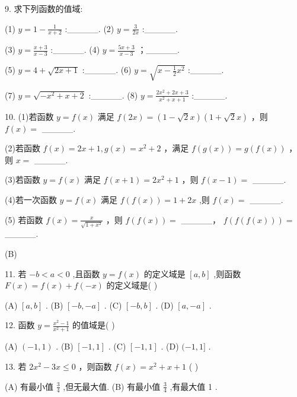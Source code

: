 \documentclass[10pt]{article}
\begin{document}
9. 求下列函数的值域:

(1) \(y = 1 - \frac{1}{x + 2}\) :\_\_\_\_\_. (2) \(y = \frac{3}{2x}\) :\_\_\_\_\_.

(3) \(y = \frac{x + 3}{x - 3}\) :\_\_\_\_\_. (4) \(y = \frac{{5x} + 3}{x - 3}\) ；\_\_\_\_\_.

(5) \(y = 4 + \sqrt{{2x} + 1}\) :\_\_\_\_\_. (6) \(y = \sqrt{x - \frac{1}{2}{x}^{2}}\) :\_\_\_\_\_.

(7) \(y = \sqrt{-{x}^{2} + x + 2}\) :\_\_\_\_\_. (8) \(y = \frac{2{x}^{2} + {2x} + 3}{{x}^{2} + x + 1}\) :\_\_\_\_\_.

10. (1)若函数 \(y = f\left( x\right)\) 满足 \(f\left( {2x}\right)  = \left( {1 - \sqrt{2}x}\right) \left( {1 + \sqrt{2}x}\right)\) ，则 \(f\left( x\right)  =\) \_\_\_\_\_.

(2)若函数 \(f\left( x\right)  = {2x} + 1,g\left( x\right)  = {x}^{2} + 2\) ，满足 \(f\left( {g\left( x\right) }\right)  = g\left( {f\left( x\right) }\right)\) ，则 \(x =\) \_\_\_\_\_.

(3)若函数 \(y = f\left( x\right)\) 满足 \(f\left( {x + 1}\right)  = 2{x}^{2} + 1\) ，则 \(f\left( {x - 1}\right)  =\) \_\_\_\_\_.

(4)若一次函数 \(y = f\left( x\right)\) 满足 \(f\left( {f\left( x\right) }\right)  = 1 + {2x}\) ,则 \(f\left( x\right)  =\) \_\_\_\_\_.

(5) 若函数 \(f\left( x\right)  = \frac{x}{\sqrt{1 + {x}^{2}}}\) ，则 \(f\left( {f\left( x\right) }\right)  =\) \_\_\_\_\_， \(f\left( {f\left( {f\left( x\right) }\right) }\right)  =\) \_\_\_\_\_.

(B)

11. 若 \(- b < a < 0\) ,且函数 \(y = f\left( x\right)\) 的定义域是 \(\left\lbrack  {a,b}\right\rbrack\) ,则函数 \(F\left( x\right)  = f\left( x\right)  + f\left( {-x}\right)\) 的定义域是( )

(A) \(\left\lbrack  {a,b}\right\rbrack\) . (B) \(\left\lbrack  {-b, - a}\right\rbrack\) . (C) \(\left\lbrack  {-b,b}\right\rbrack\) . (D) \(\left\lbrack  {a, - a}\right\rbrack\) .

12. 函数 \(y = \frac{{x}^{2} - 1}{{x}^{2} + 1}\) 的值域是( )

(A) \(\left( {-1,1}\right)\) . (B) \(\left\lbrack  {-1,1}\right\rbrack\) . (C) \(\left\lbrack  {-1,1}\right\rbrack\) . (D) \(( - 1,1\rbrack\) .

13. 若 \(2{x}^{2} - {3x} \leq  0\) ，则函数 \(f\left( x\right)  = {x}^{2} + x + 1\) ( )

(A) 有最小值 \(\frac{3}{4}\) ,但无最大值. (B) 有最小值 \(\frac{3}{4}\) ,有最大值 1 .
\end{document}
